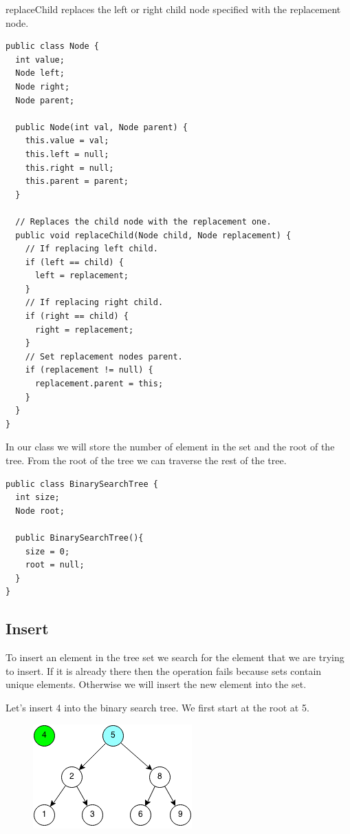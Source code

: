 \documentclass[11pt,oneside]{book}
\makeatletter
\def\maxwidth#1{\ifdim\Gin@nat@width>#1 #1\else\Gin@nat@width\fi}
\makeatother
\begin{document}
replaceChild replaces the left or right child node specified with the replacement node.

\begin{lstlisting}
public class Node {
  int value;
  Node left;
  Node right;
  Node parent;

  public Node(int val, Node parent) {
    this.value = val;
    this.left = null;
    this.right = null;
    this.parent = parent;
  }

  // Replaces the child node with the replacement one.
  public void replaceChild(Node child, Node replacement) {
    // If replacing left child.
    if (left == child) {
      left = replacement;
    }
    // If replacing right child.
    if (right == child) {
      right = replacement;
    }
    // Set replacement nodes parent.
    if (replacement != null) {
      replacement.parent = this;
    }
  }
}
\end{lstlisting}

In our class we will store the number of element in the set and the root of the tree. From the root of the tree we can traverse the rest of the tree.

\begin{lstlisting}
public class BinarySearchTree {
  int size;
  Node root;
    
  public BinarySearchTree(){
    size = 0;
    root = null;
  }
}
\end{lstlisting}

\subsection{Insert}

To insert an element in the tree set we search for the element that we are trying to insert. If it is already there then the operation fails because sets contain unique elements. Otherwise we will insert the new element into the set.

Let's insert 4 into the binary search tree. We first start at the root at 5.

\vspace{5px}\begin{figure}[H]\centering
        \includegraphics[width=0.66\maxwidth{\textwidth}]{bstinsert.png}
        \end{figure}
\end{document}
